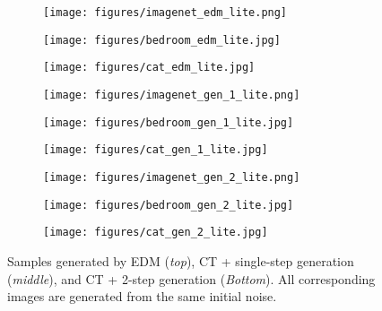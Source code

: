 \begin{figure*}
    \centering
    \begin{subfigure}[b]{0.33\textwidth}
        \texttt{[image: figures/imagenet\_edm\_lite.png]}
    \end{subfigure}\hfill
    \begin{subfigure}[b]{0.33\textwidth}
        \texttt{[image: figures/bedroom\_edm\_lite.jpg]}
    \end{subfigure}\hfill
    \begin{subfigure}[b]{0.33\textwidth}
        \texttt{[image: figures/cat\_edm\_lite.jpg]}
    \end{subfigure}
    \begin{subfigure}[b]{0.33\textwidth}
        \texttt{[image: figures/imagenet\_gen\_1\_lite.png]}
    \end{subfigure}\hfill
    \begin{subfigure}[b]{0.33\textwidth}
        \texttt{[image: figures/bedroom\_gen\_1\_lite.jpg]}
    \end{subfigure}\hfill
    \begin{subfigure}[b]{0.33\textwidth}
        \texttt{[image: figures/cat\_gen\_1\_lite.jpg]}
    \end{subfigure}
    \begin{subfigure}[b]{0.33\textwidth}
        \texttt{[image: figures/imagenet\_gen\_2\_lite.png]}
    \end{subfigure}\hfill
    \begin{subfigure}[b]{0.33\textwidth}
        \texttt{[image: figures/bedroom\_gen\_2\_lite.jpg]}
    \end{subfigure}\hfill
    \begin{subfigure}[b]{0.33\textwidth}
        \texttt{[image: figures/cat\_gen\_2\_lite.jpg]}
    \end{subfigure}
    \caption{Samples generated by EDM (\emph{top}), CT + single-step generation (\emph{middle}), and CT + 2-step generation (\emph{Bottom}). All corresponding images are generated from the same initial noise.}
    \label{fig:samples}
\end{figure*}


